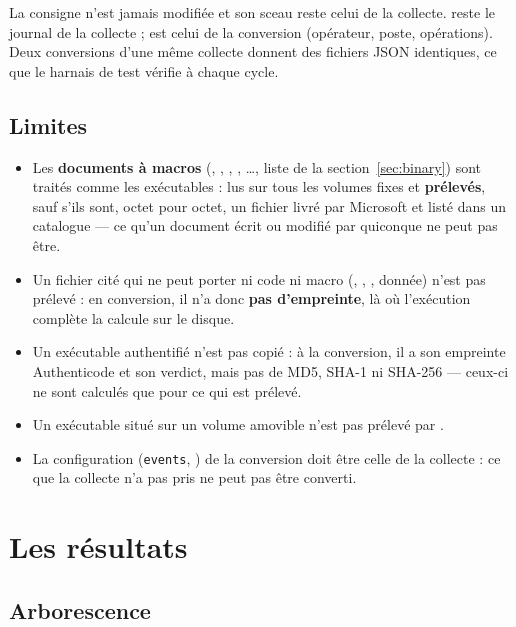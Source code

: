 \documentclass[11pt,a4paper,oneside]{report}
\begin{document}
La consigne n'est jamais modifiée et son sceau reste celui de la collecte.
 reste le journal de la collecte ;
 est celui de la conversion (opérateur, poste,
opérations). Deux conversions d'une même collecte donnent des fichiers JSON
identiques, ce que le harnais de test vérifie à chaque cycle.

\section{Limites}

\begin{itemize}
  \item Les \textbf{documents à macros} (, ,
        , , \ldots, liste de la
        section~\ref{sec:binary}) sont traités comme les exécutables : lus sur
        tous les volumes fixes et \textbf{prélevés}, sauf s'ils sont, octet pour
        octet, un fichier livré par Microsoft et listé dans un catalogue — ce
        qu'un document écrit ou modifié par quiconque ne peut pas être.
  \item Un fichier cité qui ne peut porter ni code ni macro (,
        , , donnée) n'est pas prélevé : en
        conversion, il n'a donc \textbf{pas d'empreinte}, là où l'exécution
        complète la calcule sur le disque.
  \item Un exécutable authentifié n'est pas copié : à la conversion, il a son
        empreinte Authenticode et son verdict, mais pas de MD5, SHA-1 ni
        SHA-256 — ceux-ci ne sont calculés que pour ce qui est prélevé.
  \item Un exécutable situé sur un volume amovible n'est pas prélevé par
         .
  \item La configuration (\texttt{events}, ) de la conversion doit
        être celle de la collecte : ce que la collecte n'a pas pris ne peut pas être
        converti.
\end{itemize}

\chapter{Les résultats}

\section{Arborescence}
\end{document}
